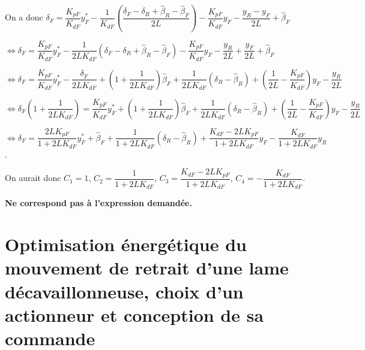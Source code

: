 \documentclass[11pt]{article}
\begin{document}
\begin{UPSTIcorrige}
On a donc 
$\delta_F  = \dfrac{K_{pF}}{K_{dF}}y_F^* - \dfrac{1}{K_{dF}}\left(  \dfrac{ \delta_F- \delta_R +\hat{\beta}_R-\hat{\beta}_F}{2L} \right) - \dfrac{K_{pF}}{K_{dF}}y_F-   \dfrac{y_R-y_F}{2L} +\hat{\beta}_F $

$\Leftrightarrow \delta_F  = \dfrac{K_{pF}}{K_{dF}}y_F^* - \dfrac{1}{2L K_{dF}}\left(   \delta_F- \delta_R +\hat{\beta}_R-\hat{\beta}_F \right) - \dfrac{K_{pF}}{K_{dF}}y_F   -   \dfrac{y_R}{2L}+   \dfrac{y_F}{2L} +\hat{\beta}_F $

$\Leftrightarrow \delta_F  = \dfrac{K_{pF}}{K_{dF}}y_F^* 
-\dfrac{ \delta_F}{2L K_{dF}}
+  \left(1+\dfrac{1}{2L K_{dF}}\right)\hat{\beta}_F
+\dfrac{1}{2L K_{dF}}\left(   \delta_R -\hat{\beta}_R \right)  
+\left( \dfrac{1}{2L}  - \dfrac{K_{pF}}{K_{dF}}\right)y_F 
- \dfrac{y_R}{2L} $

$\Leftrightarrow \delta_F  \left(1+ \dfrac{ 1}{2L K_{dF}}\right)= \dfrac{K_{pF}}{K_{dF}}y_F^* 
+  \left(1+\dfrac{1}{2L K_{dF}}\right)\hat{\beta}_F
+\dfrac{1}{2L K_{dF}}\left(   \delta_R -\hat{\beta}_R \right)  
+\left( \dfrac{1}{2L}  - \dfrac{K_{pF}}{K_{dF}}\right)y_F 
- \dfrac{y_R}{2L} $

$\Leftrightarrow \delta_F   = 
\dfrac{2L K_{pF}}{ 1+2L K_{dF}}  y_F^* 
+\hat{\beta}_F
+\dfrac{1}{ 1+2L K_{dF}} \left(   \delta_R -\hat{\beta}_R \right)  
+\dfrac{K_{dF} - 2LK_{pF}}{ 1+2L K_{dF}} y_F 
- \dfrac{ K_{dF}}{ 1+2L K_{dF}}y_R $.

On aurait donc $C_1 = 1$, $C_2 = \dfrac{1}{ 1+2L K_{dF}}$, $C_3 =\dfrac{K_{dF} - 2LK_{pF}}{ 1+2L K_{dF}} $, $C_4= - \dfrac{ K_{dF}}{ 1+2L K_{dF}} $.
\begin{flushright}
\textbf{Ne correspond pas à l'expression demandée.}
\end{flushright}
\end{UPSTIcorrige}




\section{Optimisation énergétique du mouvement de retrait d’une lame
décavaillonneuse, choix d’un actionneur et conception de sa commande}
\end{document}
